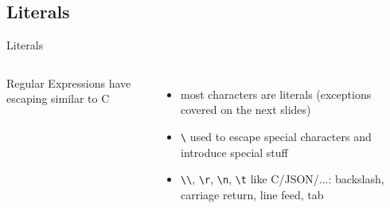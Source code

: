 \documentclass[english,aspectratio=169]{beamer}
\begin{document}
\subsection{Literals}
\begin{frame}{Literals}
\begin{columns}
        Regular Expressions have escaping similar to C
        \begin{itemize}
            \item most characters are literals (exceptions covered on the next slides)
            \item \texttt{\textbackslash} used to escape special characters and introduce special stuff
            \item \texttt{\textbackslash{}\textbackslash}, \texttt{\textbackslash{}r}, \texttt{\textbackslash{}n}, \texttt{\textbackslash{}t} like C/JSON/...: backslash, carriage return, line feed, tab
        \end{itemize}
        \begin{center}
        \end{center}
\end{columns}
\end{frame}
\end{document}
